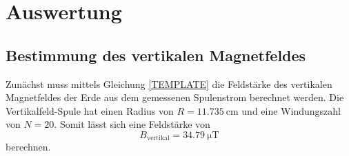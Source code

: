 \section{Auswertung}
\label{sec:Auswertung}
\subsection{Bestimmung des vertikalen Magnetfeldes}
Zunächst muss mittels Gleichung \eqref{TEMPLATE} die Feldstärke des vertikalen Magnetfeldes der Erde aus dem gemessenen Spulenstrom berechnet werden.
Die Vertikalfeld-Spule hat einen Radius von $R = \qty{11.735}{\centi\metre}$ und eine Windungszahl von $N = 20$.\cite{TEMPLATE}
Somit lässt sich eine Feldstärke von 
\begin{equation*}
    B_{\text{vertikal}} = \qty{34.79}{\micro\tesla}
\end{equation*}
berechnen.
